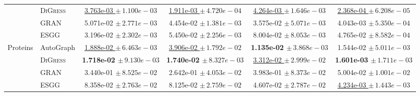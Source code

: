 {\begin{tabular}{llcccc}
 & \textsc{DiGress} & \underline{3.763e-03 $\pm\,\scriptstyle{1.100e-03}$} & \underline{1.911e-03 $\pm\,\scriptstyle{4.720e-04}$} & \underline{4.264e-03 $\pm\,\scriptstyle{1.646e-03}$} & \underline{2.368e-04 $\pm\,\scriptstyle{6.208e-05}$} \\
 & GRAN & 5.071e-02 $\pm\,\scriptstyle{2.771e-03}$ & 4.454e-02 $\pm\,\scriptstyle{1.381e-03}$ & 3.575e-02 $\pm\,\scriptstyle{5.071e-03}$ & 4.043e-03 $\pm\,\scriptstyle{5.350e-04}$ \\
 & ESGG & 3.196e-02 $\pm\,\scriptstyle{2.302e-03}$ & 5.450e-02 $\pm\,\scriptstyle{2.256e-03}$ & 8.004e-02 $\pm\,\scriptstyle{8.053e-03}$ & 4.765e-02 $\pm\,\scriptstyle{8.582e-04}$ \\
\midrule
Proteins & AutoGraph & \underline{1.888e-02 $\pm\,\scriptstyle{6.463e-03}$} & \underline{3.906e-02 $\pm\,\scriptstyle{1.792e-02}$} & \textbf{1.135e-02 $\pm\,\scriptstyle{3.868e-03}$} & 1.544e-02 $\pm\,\scriptstyle{5.011e-03}$ \\
 & \textsc{DiGress} & \textbf{1.718e-02 $\pm\,\scriptstyle{9.130e-03}$} & \textbf{1.740e-02 $\pm\,\scriptstyle{8.327e-03}$} & \underline{3.312e-02 $\pm\,\scriptstyle{2.999e-02}$} & \textbf{1.601e-03 $\pm\,\scriptstyle{1.711e-03}$} \\
 & GRAN & 3.440e-01 $\pm\,\scriptstyle{8.525e-02}$ & 2.642e-01 $\pm\,\scriptstyle{4.053e-02}$ & 3.983e-01 $\pm\,\scriptstyle{8.373e-02}$ & 5.004e-02 $\pm\,\scriptstyle{1.001e-02}$ \\
 & ESGG & 8.358e-02 $\pm\,\scriptstyle{2.763e-02}$ & 8.125e-02 $\pm\,\scriptstyle{2.759e-02}$ & 4.607e-02 $\pm\,\scriptstyle{2.787e-02}$ & \underline{4.234e-03 $\pm\,\scriptstyle{1.443e-03}$} \\
\bottomrule
\end{tabular}}